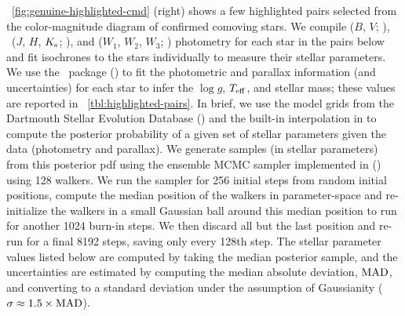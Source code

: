 \documentclass[modern, letterpaper]{aastex61}
\newcommand{\tmass}{\acronym{2MASS}}
\newcommand{\logg}{\ensuremath{\ensuremath{\log g}}}
\newcommand{\teff}{\ensuremath{\ensuremath{T_{\rm eff}}}}
\begin{document}
\figurename~\ref{fig:genuine-highlighted-cmd} (right) shows a few highlighted
pairs selected from the color-magnitude diagram of confirmed comoving stars.
We compile  ($B$, $V$; \citealt{Hog:2000}), \tmass\
($J$, $H$, $K_{\rm s}$; \citealt{Skrutskie:2006}), and  ($W_1$,
$W_2$, $W_3$; \citealt{Wright:2010}) photometry for each star in the pairs below
and fit isochrones to the stars individually to measure their stellar
parameters.
We use the  \python\ package (\citealt{Morton:2015}) to fit
the photometric and parallax information (and uncertainties) for each star to
infer the \logg, \teff, and stellar mass; these values are reported in
\tablename~\ref{tbl:highlighted-pairs}.
In brief, we use the model grids from the Dartmouth Stellar Evolution Database
(\citealt{Dotter:2008}) and the built-in interpolation in \package{isochrones}
to compute the posterior probability of a given set of stellar parameters given
the data (photometry and parallax).
We generate samples (in stellar parameters) from this posterior pdf using the
ensemble MCMC sampler implemented in \package{emcee}
(\citealt{Foreman-Mackey:2013}) using 128 walkers.
We run the sampler for 256 initial steps from random initial positions, compute
the median position of the walkers in parameter-space and re-initialize the
walkers in a small Gaussian ball around this median position to run for another
1024 burn-in steps.
We then discard all but the last position and re-run for a final 8192 steps,
saving only every 128th step.
The stellar parameter values listed below are computed by taking the median
posterior sample, and the uncertainties are estimated by computing the median
absolute deviation, ${\rm MAD}$, and converting to a standard deviation under
the assumption of Gaussianity ($\sigma \approx 1.5 \times {\rm MAD}$).
\end{document}
